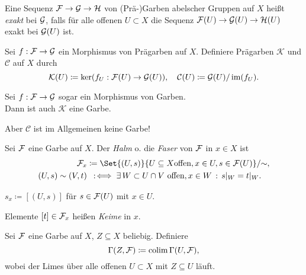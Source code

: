 \documentclass{cheat-sheet}
\begin{document}


\begin{defn}
  Eine Sequenz $\mathcal{F} \to \mathcal{G} \to \mathcal{H}$ von (Prä-)Garben abelscher Gruppen auf $X$ heißt \emph{exakt} bei $\mathcal{G}$, falls für alle offenen $U \subset X$ die Sequenz $\mathcal{F}(U) \to \mathcal{G}(U) \to \mathcal{H}(U)$ exakt bei $\mathcal{G}(U)$ ist.
\end{defn}

\begin{defn}
  Sei $f : \mathcal{F} \to \mathcal{G}$ ein Morphismus von Prägarben auf $X$. Definiere Prägarben $\mathcal{K}$ und $\mathcal{C}$ auf $X$ durch
  \[
    \mathcal{K}(U) \coloneqq \ker (f_U : \mathcal{F}(U) \to \mathcal{G}(U)), \quad
    \mathcal{C}(U) \coloneqq \mathcal{G}(U) / \operatorname{im} (f_U).
  \]
\end{defn}

\begin{prop}
  Sei $f : \mathcal{F} \to \mathcal{G}$ sogar ein Morphismus von Garben. \\
  Dann ist auch $\mathcal{K}$ eine Garbe.
\end{prop}

\begin{acht}
  Aber $\mathcal{C}$ ist im Allgemeinen keine Garbe!
\end{acht}


\begin{defn}
  Sei $\mathcal{F}$ eine Garbe auf $X$. Der \emph{Halm} o. die \emph{Faser} von $\mathcal{F}$ in $x \in X$ ist
  \begin{align*}
    \Fais_x & \coloneqq \Set{(U, s)}{U \subseteq X \text{offen}, x \in U, s \in \Fais(U)} / {\sim}, \\
    (U, s) \sim (V, t) & \coloniff \ex{W \subset U \cap V \text{ offen}, x \in W} s|_W = t|_W.
  \end{align*}
\end{defn}

\begin{nota}
  $s_x \coloneqq [(U, s)]$ für $s \in \mathcal{F}(U)$ mit $x \in U$.
\end{nota}

\begin{sprech}
  Elemente $[t] \in \mathcal{F}_x$ heißen \emph{Keime} in $x$.
\end{sprech}

\begin{defn}
  Sei $\mathcal{F}$ eine Garbe auf $X$, $Z \subseteq X$ beliebig. Definiere
  \[ \Gamma(Z, \mathcal{F}) \coloneqq \operatorname{colim} \Gamma(U, \mathcal{F}), \]
  wobei der Limes über alle offenen $U \subset X$ mit $Z \subseteq U$ läuft.
\end{defn}
\end{document}
